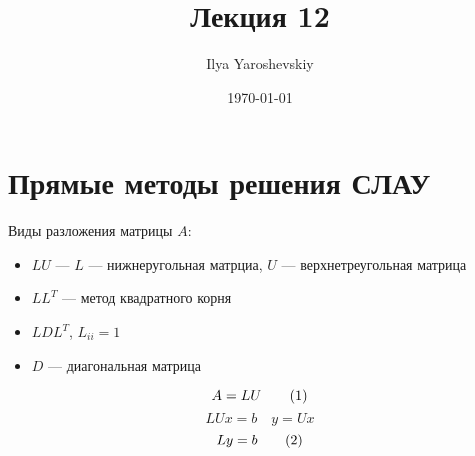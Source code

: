 \documentclass[english]{article}
\author{Ilya Yaroshevskiy}
\date{\today}
\title{Лекция 12}
\newcommand\addtag{\refstepcounter{equation}\tag{\theequation}}
\theoremstyle{plain}
\theoremstyle{remark}
\theoremstyle{definition}
\begin{document}
\maketitle
\tableofcontents


\section{Прямые методы решения СЛАУ}
\label{sec:orge5a4f8d}
Виды разложения матрицы \(A\):
\begin{itemize}
\item \(LU\) --- \(L\) --- нижнеругольная матрциа, \(U\) --- верхнетреугольная матрица
\item \(LL^T\) --- метод квадратного корня
\item \(LDL^T\), \(L_{ii} = 1\)
\item \(D\) --- диагональная матрица
\end{itemize}


\[A = LU \addtag\label{eq_2_12} \]
\[ LUx = b \quad y = Ux\]
\[ Ly = b \addtag\label{eq_4_12} \]
\end{document}
